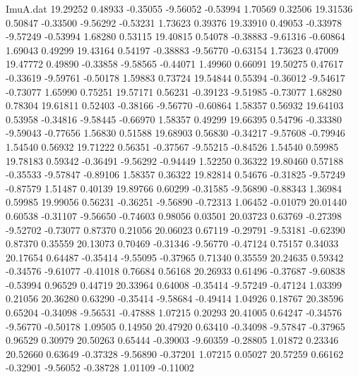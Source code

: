 \begin{filecontents}{ImuA.dat}
  19.29252    0.48933   -0.35055   -9.56052   -0.53994    1.70569    0.32506
  19.31536    0.50847   -0.33500   -9.56292   -0.53231    1.73623    0.39376
  19.33910    0.49053   -0.33978   -9.57249   -0.53994    1.68280    0.53115
  19.40815    0.54078   -0.38883   -9.61316   -0.60864    1.69043    0.49299
  19.43164    0.54197   -0.38883   -9.56770   -0.63154    1.73623    0.47009
  19.47772    0.49890   -0.33858   -9.58565   -0.44071    1.49960    0.66091
  19.50275    0.47617   -0.33619   -9.59761   -0.50178    1.59883    0.73724
  19.54844    0.55394   -0.36012   -9.54617   -0.73077    1.65990    0.75251
  19.57171    0.56231   -0.39123   -9.51985   -0.73077    1.68280    0.78304
  19.61811    0.52403   -0.38166   -9.56770   -0.60864    1.58357    0.56932
  19.64103    0.53958   -0.34816   -9.58445   -0.66970    1.58357    0.49299
  19.66395    0.54796   -0.33380   -9.59043   -0.77656    1.56830    0.51588
  19.68903    0.56830   -0.34217   -9.57608   -0.79946    1.54540    0.56932
  19.71222    0.56351   -0.37567   -9.55215   -0.84526    1.54540    0.59985
  19.78183    0.59342   -0.36491   -9.56292   -0.94449    1.52250    0.36322
  19.80460    0.57188   -0.35533   -9.57847   -0.89106    1.58357    0.36322
  19.82814    0.54676   -0.31825   -9.57249   -0.87579    1.51487    0.40139
  19.89766    0.60299   -0.31585   -9.56890   -0.88343    1.36984    0.59985
  19.99056    0.56231   -0.36251   -9.56890   -0.72313    1.06452   -0.01079
  20.01440    0.60538   -0.31107   -9.56650   -0.74603    0.98056    0.03501
  20.03723    0.63769   -0.27398   -9.52702   -0.73077    0.87370    0.21056
  20.06023    0.67119   -0.29791   -9.53181   -0.62390    0.87370    0.35559
  20.13073    0.70469   -0.31346   -9.56770   -0.47124    0.75157    0.34033
  20.17654    0.64487   -0.35414   -9.55095   -0.37965    0.71340    0.35559
  20.24635    0.59342   -0.34576   -9.61077   -0.41018    0.76684    0.56168
  20.26933    0.61496   -0.37687   -9.60838   -0.53994    0.96529    0.44719
  20.33964    0.64008   -0.35414   -9.57249   -0.47124    1.03399    0.21056
  20.36280    0.63290   -0.35414   -9.58684   -0.49414    1.04926    0.18767
  20.38596    0.65204   -0.34098   -9.56531   -0.47888    1.07215    0.20293
  20.41005    0.64247   -0.34576   -9.56770   -0.50178    1.09505    0.14950
  20.47920    0.63410   -0.34098   -9.57847   -0.37965    0.96529    0.30979
  20.50263    0.65444   -0.39003   -9.60359   -0.28805    1.01872    0.23346
  20.52660    0.63649   -0.37328   -9.56890   -0.37201    1.07215    0.05027
  20.57259    0.66162   -0.32901   -9.56052   -0.38728    1.01109   -0.11002

\end{filecontents}
